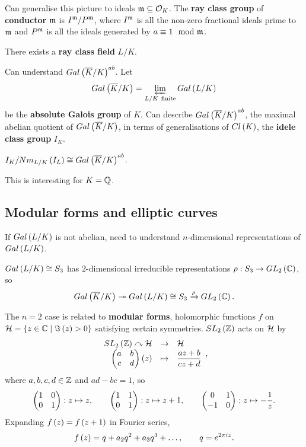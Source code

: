 Can generalise this picture to ideals $ \mathfrak{m} \subseteq \mathcal{O}_K $. The \textbf{ray class group} of \textbf{conductor} $ \mathfrak{m} $ is $ I^{\mathfrak{m}} / P^{\mathfrak{m}} $, where $ I^{\mathfrak{m}} $ is all the non-zero fractional ideals prime to $ \mathfrak{m} $ and $ P^{\mathfrak{m}} $ is all the ideals generated by $ a \equiv 1 \mod {\mathfrak{m}} $.

\begin{theorem}
There exists a \textbf{ray class field} $ L / K $.
\end{theorem}

Can understand $ Gal\left( \overline{K} / K \right)^{ab} $. Let
$$ Gal\left( \overline{K} / K \right) = \varprojlim_{L / K \ \text{finite}} Gal\left( L / K \right) $$
be the \textbf{absolute Galois group} of $ K $. Can describe $ Gal\left( \overline{K} / K \right)^{ab} $, the maximal abelian quotient of $ Gal\left( \overline{K} / K \right) $, in terms of generalisations of $ Cl\left( K \right) $, the \textbf{idele class group} $ I_K $.

\begin{theorem}
$ I_K / Nm_{L / K}\left( I_L \right) \cong Gal\left( \overline{K} / K \right)^{ab} $.
\end{theorem}

This is interesting for $ K = \mathbb{Q} $.

\subsection{Modular forms and elliptic curves}

If $ Gal\left( L / K \right) $ is not abelian, need to understand $ n $-dimensional representations of $ Gal\left( L / K \right) $.

\begin{example*}
$ Gal\left( L / K \right) \cong S_3 $ has $ 2 $-dimensional irreducible representations $ \rho : S_3 \to GL_2\left( \mathbb{C} \right) $, so
$$ Gal\left( \overline{K} / K \right) \twoheadrightarrow Gal\left( L / K \right) \cong S_3 \xrightarrow{\rho} GL_2\left( \mathbb{C} \right). $$
\end{example*}

The $ n = 2 $ case is related to \textbf{modular forms}, holomorphic functions $ f $ on $ \mathcal{H} = \left\{ z \in \mathbb{C} \mid \Im\left( z \right) > 0 \right\} $ satisfying certain symmetries. $ SL_2\left( \mathbb{Z} \right) $ acts on $ \mathcal{H} $ by
$$ \function{SL_2\rb{\Z} \curvearrowright \HH}{\HH}{\twobytwo{a}{b}{c}{d}\rb{z}}{\dfrac{az + b}{cz + d}}, $$
where $ a, b, c, d \in \mathbb{Z} $ and $ ad - bc = 1 $, so
$$ \begin{pmatrix} 1 & 0 \\ 0 & 1 \end{pmatrix} : z \mapsto z, \qquad \begin{pmatrix} 1 & 1 \\ 0 & 1 \end{pmatrix} : z \mapsto z + 1, \qquad \begin{pmatrix} 0 & 1 \\ -1 & 0 \end{pmatrix} : z \mapsto -\dfrac{1}{z}. $$
Expanding $ f\left( z \right) = f\left( z + 1 \right) $ in Fourier series,
$$ f\left( z \right) = q + a_2q^2 + a_3q^3 + \dots, \qquad q = e^{2\pi iz}. $$

